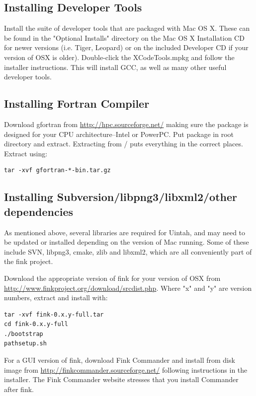 \documentclass[12pt]{article}
\begin{document}
\subsection{Installing Developer Tools}
Install the suite of developer tools that are packaged with Mac OS X.
These can be found in the "Optional Installs" directory on the Mac OS
X Installation CD for newer versions (i.e. Tiger, Leopard) or on the
included Developer CD if your version of OSX is older).  Double-click
the XCodeTools.mpkg and follow the installer instructions.  This will
install GCC, as well as many other useful developer tools.

\subsection{Installing Fortran Compiler}
Download gfortran from \url{http://hpc.sourceforge.net/} making sure
the package is designed for your CPU architecture--Intel or PowerPC.
Put package in root directory and extract.  Extracting from / puts
everything in the correct places.  Extract using:

\begin{verbatim}
tar -xvf gfortran-*-bin.tar.gz
\end{verbatim}

\subsection{Installing Subversion/libpng3/libxml2/other dependencies}
As mentioned above, several libraries are required for Uintah, and may
need to be updated or installed depending on the version of Mac
running.  Some of these include SVN, libpng3, cmake, zlib and libxml2,
which are all conveniently part of the fink project.

Download the appropriate version of fink for your version of OSX from
\url{http://www.finkproject.org/download/srcdist.php}.  Where "x" and
"y" are version numbers, extract and install with:

\begin{verbatim}
tar -xvf fink-0.x.y-full.tar 
cd fink-0.x.y-full
./bootstrap 
pathsetup.sh
\end{verbatim}

For a GUI version of fink, download Fink Commander and install from
disk image from \url{http://finkcommander.sourceforge.net/} following
instructions in the installer.  The Fink Commander website stresses
that you install Commander after fink.
\end{document}
